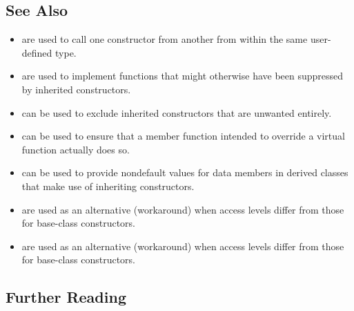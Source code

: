 \subsection[See Also]{See Also}\label{see-also}

\begin{itemize}
\item{%
are used to call one constructor from another from within the same user-defined type.}
\item{%
are used to implement functions that might otherwise have been suppressed by inherited constructors.}
\item{%
can be used to exclude inherited constructors that are unwanted entirely.}
\item{%
can be used to ensure that a member function intended to override a virtual function actually does so.}
\item{%
can be used to provide nondefault values for data members in derived classes that make use of inheriting constructors.}
\item{%
are used as an alternative (workaround) when access levels differ from those for base-class constructors.}
\item{%
are used as an alternative (workaround) when access levels differ from those for base-class constructors.}
\end{itemize}

\subsection[Further Reading]{Further Reading}\label{further-reading}

